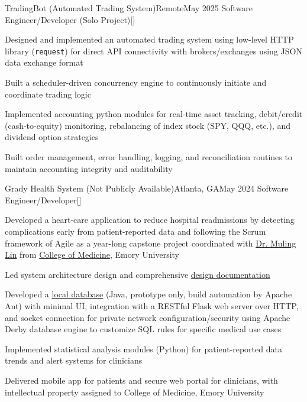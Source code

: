\begin{resume-itemize}
  {TradingBot (Automated Trading System)}{Remote}{May 2025}
  {Software Engineer/Developer (Solo Project)}[\href{https://github.com/YundaeLeeSong/ydjs-references/tree/main/project2505-app_tradingbot}{}]
  \item Designed and implemented an automated trading system using low-level HTTP library (\texttt{request}) 
  for direct API connectivity with brokers/exchanges using JSON data exchange format
  \item Built a scheduler-driven concurrency engine to continuously initiate and coordinate trading logic
  \item Implemented accounting python modules for real-time asset tracking, debit/credit (cash-to-equity) monitoring, 
  rebalancing of index stock (SPY, QQQ, etc.), and dividend option strategies
  \item Built order management, error handling, logging, and reconciliation routines 
  to maintain accounting integrity and auditability
\end{resume-itemize}
\begin{resume-itemize}
  {Grady Health System (Not Publicly Available)}{Atlanta, GA}{May 2024}
  {Software Engineer/Developer}[]
  \item Developed a heart-care application to reduce hospital readmissions by detecting complications early 
  from patient-reported data and following the Scrum framework of Agile as a year-long capstone project coordinated with 
  \href{https://www.doximity.com/pub/muling-lin-md-bec64b54}{Dr. Muling Lin} from 
  \href{https://med.emory.edu/departments/medicine/_documents/resident-photo-book-2022-2023.pdf}{College of Medicine}, Emory University
  \item Led system architecture design and comprehensive 
  \href{https://yundaeleesong.github.io/project2405-server_derbyDB-docs.pdf}{design documentation}
  \item Developed a \href{https://github.com/YundaeLeeSong/ydjs-references/tree/main/project2405-server_derbyDB}{local database}
  (Java, prototype only, build automation by Apache Ant) with minimal UI, integration with a RESTful Flask web server over HTTP, and socket connection for private network configuration/security 
  using Apache Derby database engine to customize SQL rules for specific medical use cases
  \item Implemented statistical analysis modules (Python) for patient-reported data trends 
  and alert systems for clinicians
  \item Delivered mobile app for patients and secure web portal for clinicians, 
  with intellectual property assigned to College of Medicine, Emory University
\end{resume-itemize}
